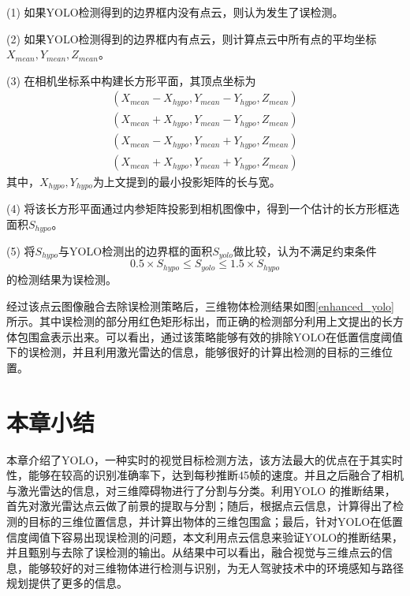 (1) 如果YOLO检测得到的边界框内没有点云，则认为发生了误检测。

(2) 如果YOLO检测得到的边界框内有点云，则计算点云中所有点的平均坐标 $X_{mean}, Y_{mean}, Z_{mean}$。

(3) 在相机坐标系中构建长方形平面，其顶点坐标为
\begin{equation}
    \begin{split}
(X_{mean} - X_{hypo}, Y_{mean}-Y_{hypo}, Z_{mean}) \\
(X_{mean} + X_{hypo}, Y_{mean}-Y_{hypo}, Z_{mean}) \\
(X_{mean} - X_{hypo}, Y_{mean}+Y_{hypo}, Z_{mean}) \\
(X_{mean} + X_{hypo}, Y_{mean}+Y_{hypo}, Z_{mean})
    \end{split}
\end{equation}
其中，$X_{hypo}, Y_{hypo}$为上文提到的最小投影矩阵的长与宽。

(4) 将该长方形平面通过内参矩阵投影到相机图像中，得到一个估计的长方形框选面积$S_{hypo}$。

(5)
 将$S_{hypo}$与YOLO检测出的边界框的面积$S_{yolo}$做比较，认为不满足约束条件    
\begin{equation}
    0.5 \times S_{hypo} \leq S_{yolo} \leq 1.5 \times S_{hypo} 
\end{equation}
的检测结果为误检测。


经过该点云图像融合去除误检测策略后，三维物体检测结果如图\ref{enhanced_yolo}所示。其中误检测的部分用红色矩形标出，而正确的检测部分利用上文提出的长方体包围盒表示出来。可以看出，通过该策略能够有效的排除YOLO在低置信度阈值下的误检测，并且利用激光雷达的信息，能够很好的计算出检测的目标的三维位置。

\section{本章小结}

本章介绍了YOLO，一种实时的视觉目标检测方法，该方法最大的优点在于其实时性，能够在较高的识别准确率下，达到每秒推断45帧的速度。并且之后融合了相机与激光雷达的信息，对三维障碍物进行了分割与分类。利用YOLO 的推断结果，首先对激光雷达点云做了前景的提取与分割；随后，根据点云信息，计算得出了检测的目标的三维位置信息，并计算出物体的三维包围盒；最后，针对YOLO在低置信度阈值下容易出现误检测的问题，本文利用点云信息来验证YOLO的推断结果，并且甄别与去除了误检测的输出。从结果中可以看出，融合视觉与三维点云的信息，能够较好的对三维物体进行检测与识别，为无人驾驶技术中的环境感知与路径规划提供了更多的信息。


